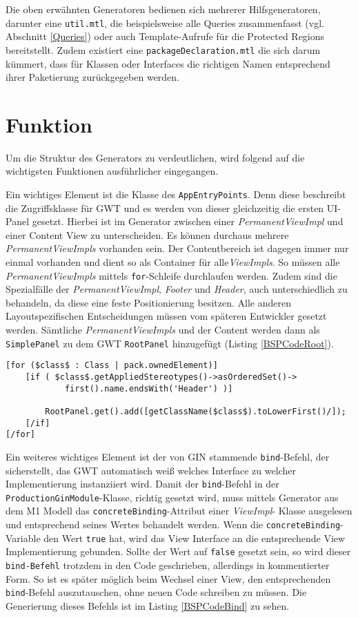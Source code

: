 Die oben erwähnten Generatoren bedienen sich mehrerer Hilfsgeneratoren, darunter eine \texttt{util.mtl}, die beispielsweise alle Queries zusammenfasst (vgl. Abschnitt \ref{Queries}) oder auch Template-Aufrufe für die Protected Regions bereitstellt. Zudem existiert eine \texttt{packageDeclaration.mtl} die sich darum kümmert, dass für Klassen oder Interfaces die richtigen Namen entsprechend ihrer Paketierung zurückgegeben werden. 

\section{Funktion}\label{Funktion}
Um die Struktur des Generators zu verdeutlichen, wird folgend auf die wichtigsten Funktionen ausführlicher eingegangen.

Ein wichtiges Element ist die Klasse des \texttt{AppEntryPoints}. Denn diese beschreibt die Zugriffsklasse für GWT und es werden von dieser gleichzeitig die ersten UI-Panel gesetzt. Hierbei ist im Generator zwischen einer \textit{PermanentViewImpl} und einer Content View zu unterscheiden. Es können durchaus mehrere \textit{PermanentViewImpls} vorhanden sein. Der Contentbereich ist dagegen immer nur einmal vorhanden und dient so als Container für alle\textit{ViewImpls}. So müssen alle \textit{PermanentViewImpls} mittels \texttt{for}-Schleife durchlaufen werden. Zudem sind die Spezialfälle der \textit{PermanentViewImpl}, \textit{Footer} und \textit{Header}, auch unterschiedlich zu behandeln, da diese eine feste Positionierung besitzen. Alle anderen Layoutspezifischen Entscheidungen müssen vom späteren Entwickler gesetzt werden. Sämtliche \textit{PermanentViewImpls} und der Content werden dann als \texttt{SimplePanel} zu dem GWT \texttt{RootPanel} hinzugefügt (Listing \ref{BSPCodeRoot}). 
\lstset{language=mtl}
\begin{lstlisting}[caption={Hinzufügen eines Panels zum \texttt{RootPane}l, am Beipsiel eines \textit{Header}s}, label={BSPCodeRoot}]
[for ($class$ : Class | pack.ownedElement)]
	[if ( $class$.getAppliedStereotypes()->asOrderedSet()->
			first().name.endsWith('Header') )]

		RootPanel.get().add([getClassName($class$).toLowerFirst()/]);
	[/if]
[/for]
\end{lstlisting}
Ein weiteres wichtiges Element ist der von GIN stammende \texttt{bind}-Befehl, der sicherstellt, das GWT automatisch weiß welches Interface zu welcher Implementierung instanziiert wird.
Damit der \texttt{bind}-Befehl in der \texttt{ProductionGinModule}-Klasse, richtig gesetzt wird, muss mittels Generator aus dem M1 Modell das \texttt{concreteBinding}-Attribut einer \textit{ViewImpl}- Klasse ausgelesen und entsprechend seines Wertes behandelt werden. Wenn die \texttt{concreteBinding}-Variable den Wert \texttt{true} hat, wird das View Interface an die entsprechende View Implementierung gebunden. Sollte der Wert auf \texttt{false} gesetzt sein, so wird dieser \texttt{bind-Befehl} trotzdem in den Code geschrieben, allerdings in kommentierter Form. So ist es später möglich beim Wechsel einer View, den entsprechenden \texttt{bind}-Befehl auszutauschen, ohne neuen Code schreiben zu müssen. Die Generierung dieses Befehls ist im Listing \ref{BSPCodeBind} zu sehen.
